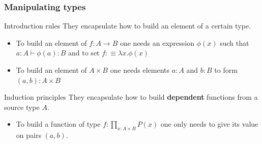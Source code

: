 \documentclass{beamer}
\begin{document}
        \begin{frame}
            \frametitle{Manipulating types}
            \begin{block}{Introduction rules}
                They encapsulate how to build an element of a certain type.
                \begin{itemize}
                    \item To build an element of $ f: A \rightarrow B$ one needs an expression $\phi(x)$ such that $a : A \vdash \phi(a) : B$ and to set $f :\equiv \lambda x. \phi(x)$
                    \item To build an element of $A \times B$ one needs elements $a : A$ and $b : B$ to form $(a,b) : A \times B$
                \end{itemize}
            \end{block}
            \pause
            \begin{block}{Induction principles}
                They encapsulate how to build \textbf{dependent} functions from a source type $A$.
                \begin{itemize}
                    \item To build a function of type $f : \prod_{x : A\times B} P(x)$ one only needs to give its value on pairs $(a,b)$. 
                \end{itemize}
            \end{block}
        \end{frame}
\end{document}
